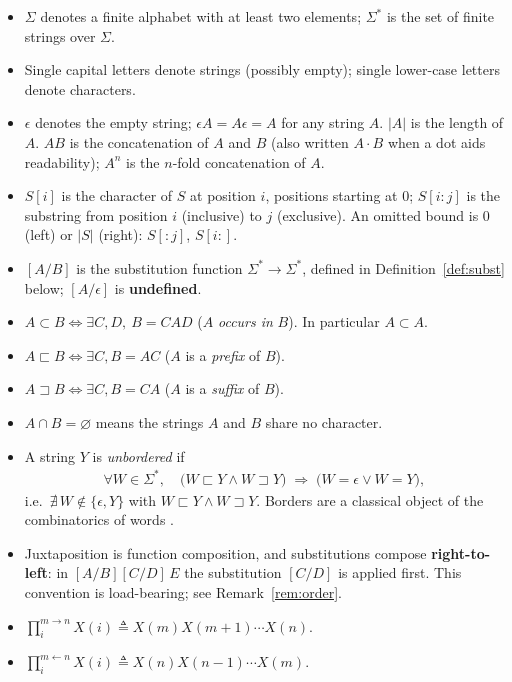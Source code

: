 \documentclass[runningheads,envcountsect]{llncs}
\begin{document}
\begin{itemize}
    \item $\Sigma$ denotes a finite alphabet with at least two elements; $\Sigma^*$ is the set of finite strings over $\Sigma$.
    \item Single capital letters denote strings (possibly empty); single lower-case letters denote characters.
    \item $\epsilon$ denotes the empty string; $\epsilon A=A\epsilon=A$ for any string $A$. $|A|$ is the length of $A$. $AB$ is the concatenation of $A$ and $B$ (also written $A\cdot B$ when a dot aids readability); $A^n$ is the $n$-fold concatenation of $A$.
    \item $S[i]$ is the character of $S$ at position $i$, positions starting at $0$; $S[i{:}j]$ is the substring from position $i$ (inclusive) to $j$ (exclusive). An omitted bound is $0$ (left) or $|S|$ (right): $S[{:}j]$, $S[i{:}]$.
    \item $[A/B]$ is the substitution function $\Sigma^* \rightarrow \Sigma^*$, defined in Definition~\ref{def:subst} below; $[A/\epsilon]$ is \textbf{undefined}.
    \item $A\subset B\Leftrightarrow \exists C, D,\ B = CAD$ ($A$ \emph{occurs in} $B$). In particular $A\subset A$.
    \item $A\sqsubset B\Leftrightarrow \exists C, B = AC$ ($A$ is a \emph{prefix} of $B$).
    \item $A\sqsupset B\Leftrightarrow \exists C, B = CA$ ($A$ is a \emph{suffix} of $B$).
    \item $A \cap B = \varnothing$ means the strings $A$ and $B$ share no character.
    \item A string $Y$ is \emph{unbordered} if
    \begin{align*}
        \forall W \in \Sigma^*,\quad \bigl(W \sqsubset Y \wedge W \sqsupset Y\bigr) \;\Rightarrow\; \bigl(W = \epsilon \vee W = Y\bigr),
    \end{align*}
    i.e.\ $\nexists\, W \notin \{\epsilon, Y\}$ with $W \sqsubset Y \wedge W \sqsupset Y$. Borders are a classical object of the combinatorics of words \cite{lothaire97}.
    \item Juxtaposition is function composition, and substitutions compose \textbf{right-to-left}: in $[A/B][C/D]\,E$ the substitution $[C/D]$ is applied first. This convention is load-bearing; see Remark~\ref{rem:order}.
    \item $\prod_i^{m\rightarrow n} X(i) \triangleq X(m)X(m+1)\cdots X(n)$.
    \item $\prod_i^{m\leftarrow n} X(i) \triangleq X(n)X(n-1)\cdots X(m)$.
\end{itemize}
\end{document}
